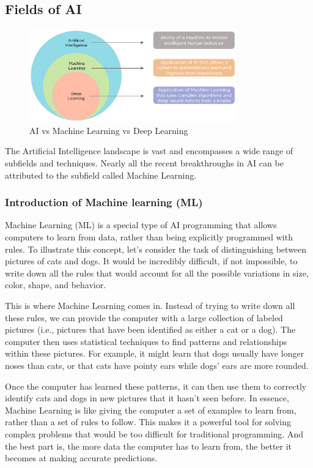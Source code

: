 \documentclass{article}
\begin{document}
\subsection{Fields of AI}

\begin{figure}[h] %
    \centering
    \includegraphics[width=0.8\textwidth]{images/AI_ML_DL.png}
    \caption{AI vs Machine Learning vs Deep Learning \cite{simplilearn_ai_ml_dl}}
\end{figure}



The Artificial Intelligence landscape is vast and encompasses a wide range
of subfields and techniques. Nearly all the recent breakthroughs in AI
can be attributed to the subfield called Machine Learning.

\subsubsection{Introduction of Machine learning (ML)}

Machine Learning (ML) is a special type of AI programming that allows
computers to learn from data, rather than being explicitly programmed
with rules. To illustrate this concept, let's consider the task of
distinguishing between pictures of cats and dogs. It would be incredibly
difficult, if not impossible, to write down all the rules that would
account for all the possible variations in size, color, shape, and
behavior.

This is where Machine Learning comes in. Instead of trying to write down
all these rules, we can provide the computer with a large collection of
labeled pictures (i.e., pictures that have been identified as either a cat
or a dog). The computer then uses statistical techniques to find patterns
and relationships within these pictures. For example, it might learn that
dogs usually have longer noses than cats, or that cats have pointy ears
while dogs' ears are more rounded.

Once the computer has learned these patterns, it can then use them
to correctly identify cats and dogs in new pictures that it hasn't
seen before. In essence, Machine Learning is like giving the computer
a set of examples to learn from, rather than a set of rules to follow.
This makes it a powerful tool for solving complex problems that would
be too difficult for traditional programming. And the best part is,
the more data the computer has to learn from, the better it becomes
at making accurate predictions.
\end{document}
